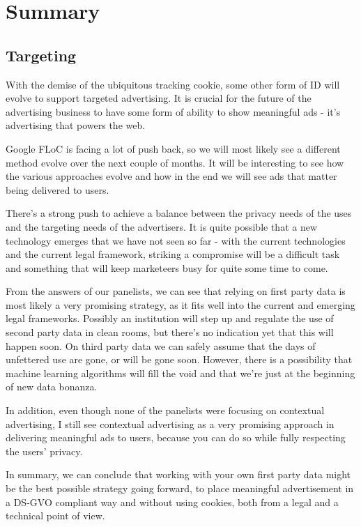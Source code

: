 %
%

\pagebreak
\section{Summary}

\onehalfspacing

\subsection{Targeting}

With the demise of the ubiquitous tracking cookie, some other form of ID will evolve to support targeted advertising. It is crucial for the future of the advertising business to have some form of ability to show meaningful ads - it's advertising that powers the web.

Google FLoC is facing a lot of push back, so we will most likely see a different method evolve over the next couple of months. It will be interesting to see how the various approaches evolve and how in the end we will see ads that matter being delivered to users.

There's a strong push to achieve a balance between the privacy needs of the uses and the targeting needs of the advertisers. It is quite possible that a new technology emerges that we have not seen so far - with the current technologies and the current legal framework, striking a compromise will be a difficult task and something that will keep marketeers busy for quite some time to come.

From the answers of our panelists, we can see that relying on first party data is most likely a very promising strategy, as it fits well into the current and emerging legal frameworks. Possibly an institution will step up and regulate the use of second party data in clean rooms, but there's no indication yet that this will happen soon. On third party data we can safely assume that the days of unfettered use are gone, or will be gone soon. However, there is a possibility that machine learning algorithms will fill the void and that we're just at the beginning of new data bonanza.

In addition, even though none of the panelists were focusing on contextual advertising, I still see contextual advertising as a very promising approach in delivering meaningful ads to users, because you can do so while fully respecting the users' privacy.

In summary, we can conclude that working with your own first party data might be the best possible strategy going forward, to place meaningful advertisement in a DS-GVO compliant way and without using cookies, both from a legal and a technical point of view.

